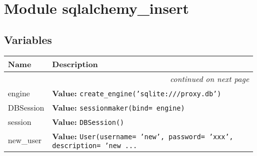 %
%
%


\section{Module sqlalchemy\_insert}

    \label{sqlalchemy_insert}


  \subsection{Variables}

    \vspace{-1cm}
\hspace{\varindent}\begin{longtable}{|p{\varnamewidth}|p{\vardescrwidth}|l}
\cline{1-2}
\cline{1-2} \centering \textbf{Name} & \centering \textbf{Description}& \\
\cline{1-2}
\endhead\cline{1-2}\multicolumn{3}{r}{\small\textit{continued on next page}}\\\endfoot\cline{1-2}
\endlastfoot\raggedright e\-n\-g\-i\-n\-e\- & \raggedright \textbf{Value:} 
{\tt create\_engine('sqlite:///proxy.db')}&\\
\cline{1-2}
\raggedright D\-B\-S\-e\-s\-s\-i\-o\-n\- & \raggedright \textbf{Value:} 
{\tt sessionmaker(bind= engine)}&\\
\cline{1-2}
\raggedright s\-e\-s\-s\-i\-o\-n\- & \raggedright \textbf{Value:} 
{\tt DBSession()}&\\
\cline{1-2}
\raggedright n\-e\-w\-\_\-u\-s\-e\-r\- & \raggedright \textbf{Value:} 
{\tt User(username= 'new', password= 'xxx', description= 'new \texttt{...}}&\\
\cline{1-2}
\end{longtable}

